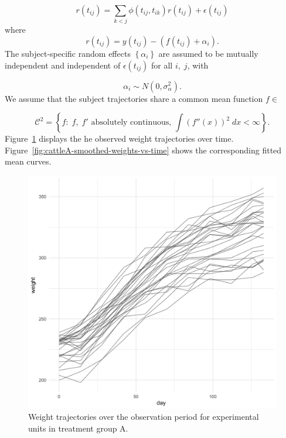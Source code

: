 \begin{equation} \label{eq:cattleA-dynamic-cond-mixed-model-1}
r\left(t_{ij}\right) = \sum_{k < j} \phi\left( t_{ij}, t_{ik} \right) r\left(t_{ij}\right) + \epsilon\left(t_{ij}\right)
\end{equation}
\noindent
where
\begin{equation} \label{eq:cattleA-dynamic-cond-mixed-model-2}
r\left(t_{ij}\right) = y\left(t_{ij}\right) - \left(f\left(t_{ij} \right) + \alpha_{i}\right).
\end{equation}
\noindent
The subject-specific random effects $\left\{ \alpha_i \right\}$ are assumed to be mutually independent and independent of $ \epsilon\left(t_{ij}\right)$ for all $i,\;j$, with

\[
\alpha_i \sim N\left( 0, \sigma_\alpha^2 \right).
\]
\noindent
We assume that the subject trajectories share a common mean function $f \in $

\[
\mathcal{C}^2 = \left\{f: \; f,\;f' \mbox{ absolutely continuous, } \int\left(f''\left(x\right)\right)^2 \;dx < \infty  \right\}.
\]
\noindent
Figure~\ref{fig:cattleA-weights-vs-time} displays the he observed weight trajectories over time. Figure~\ref{fig:cattleA-smoothed-weights-vs-time} shows the corresponding fitted mean curves.

\begin{figure}[H] 
\begin{center}
    \includegraphics[width=\textwidth]{img/cattle/cattleA-weights-vs-time}
\end{center}
 \caption{Weight trajectories over the observation period for experimental units in treatment group A.}\label{fig:cattleA-weights-vs-time}
 \end{figure}

